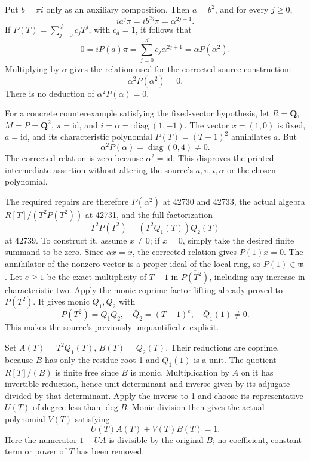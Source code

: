 Put \(b=\pi i\) only as an auxiliary composition. Then \(a=b^2\), and for every \(j\ge0\), \[
i a^j\pi=i b^{2j}\pi=\alpha^{2j+1}.
\] If \(P(T)=\sum_{j=0}^d c_jT^j\), with \(c_d=1\), it follows that \[
0=iP(a)\pi
 =\sum_{j=0}^d c_j\alpha^{2j+1}
 =\alpha P(\alpha^2).
\] Multiplying by \(\alpha\) gives the relation used for the corrected source construction: \[
\alpha^2P(\alpha^2)=0.
\] There is no deduction of \(\alpha^2P(\alpha)=0\).

For a concrete counterexample satisfying the fixed-vector hypothesis, let \(R=\mathbf Q\), \(M=P=\mathbf Q^2\), \(\pi=\mathrm{id}\), and \(i=\alpha=\operatorname{diag}(1,-1)\). The vector \(x=(1,0)\) is fixed, \(a=\mathrm{id}\), and its characteristic polynomial \(P(T)=(T-1)^2\) annihilates \(a\). But \[
\alpha^2P(\alpha)=\operatorname{diag}(0,4)\ne0.
\] The corrected relation is zero because \(\alpha^2=\mathrm{id}\). This disproves the printed intermediate assertion without altering the source's \(a,\pi,i,\alpha\) or the chosen polynomial.

The required repairs are therefore \(P(\alpha^2)\) at 42730 and 42733, the actual algebra \(R[T]/(T^2P(T^2))\) at 42731, and the full factorization \[
T^2P(T^2)=(T^2Q_1(T))Q_2(T)
\] at 42739. To construct it, assume \(x\ne0\); if \(x=0\), simply take the desired finite summand to be zero. Since \(\alpha x=x\), the corrected relation gives \(P(1)x=0\). The annihilator of the nonzero vector is a proper ideal of the local ring, so \(P(1)\in\mathfrak m\). Let \(e\ge1\) be the exact multiplicity of \(T-1\) in \(\overline{P(T^2)}\), including any increase in characteristic two. Apply the monic coprime-factor lifting already proved to \(P(T^2)\). It gives monic \(Q_1,Q_2\) with \[
P(T^2)=Q_1Q_2,\quad
\bar Q_2=(T-1)^e,\quad\bar Q_1(1)\ne0.
\] This makes the source's previously unquantified \(e\) explicit.

Set \(A(T)=T^2Q_1(T)\), \(B(T)=Q_2(T)\). Their reductions are coprime, because \(B\) has only the residue root 1 and \(Q_1(1)\) is a unit. The quotient \(R[T]/(B)\) is finite free since \(B\) is monic. Multiplication by \(A\) on it has invertible reduction, hence unit determinant and inverse given by its adjugate divided by that determinant. Apply the inverse to 1 and choose its representative \(U(T)\) of degree less than \(\deg B\). Monic division then gives the actual polynomial \(V(T)\) satisfying \[
U(T)A(T)+V(T)B(T)=1 .
\] Here the numerator \(1-UA\) is divisible by the original \(B\); no coefficient, constant term or power of \(T\) has been removed.

